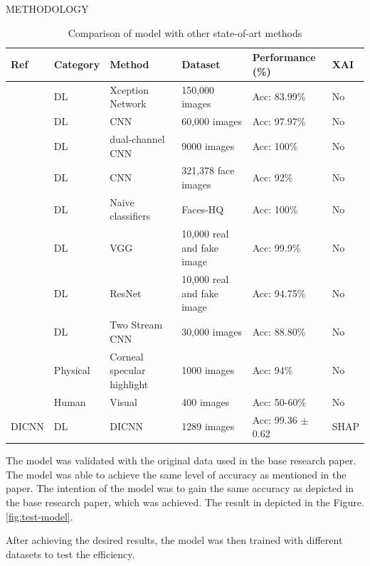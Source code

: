 \begin{section}[]{\uppercase{Methodology}}
\begin{table}[htbp]
    \centering
    \begin{adjustbox}{width=\textwidth}
    \begin{tabular}{llllll}
        \toprule
        \textbf{Ref} & \textbf{Category} & \textbf{Method} & \textbf{Dataset} & \textbf{Performance (\%)} & \textbf{XAI} \\
        \midrule
        \cite{Xu2022} & DL & Xception Network & 150,000 images & Acc: 83.99\% & No \\
        \cite{Fu2019} & DL & CNN & 60,000 images & Acc: 97.97\% & No \\
        \cite{Salman2022} & DL & dual-channel CNN & 9000 images & Acc: 100\% & No \\
        \cite{Zhang2017} & DL & CNN & 321,378 face images & Acc: 92\% & No \\
        \cite{Durall2019} & DL & Naive classifiers & Faces-HQ & Acc: 100\% & No \\
        \cite{Gandhi2020} & DL & VGG & 10,000 real and fake image & Acc: 99.9\% & No \\
        \cite{Gandhi2020} & DL & ResNet & 10,000 real and fake image & Acc: 94.75\% & No \\
        \cite{Yousaf2022} & DL & Two Stream CNN & 30,000 images & Acc: 88.80\% & No \\
        \cite{Hu2021} & Physical & Corneal specular highlight & 1000 images & Acc: 94\% & No \\
        \cite{Nightingale2021} & Human & Visual & 400 images & Acc: 50-60\% & No \\
        DICNN & DL & DICNN & 1289 images & Acc: 99.36 $\pm$ 0.62 & SHAP \\
        \bottomrule
    \end{tabular}
    \end{adjustbox}
    \caption{Comparison of model with other state-of-art methods}
    \label{tab:dicnn-comparison}
\end{table}

The model was validated with the original data used in the base research paper. The model was able to achieve the same level of accuracy as mentioned in the paper. The intention of the model was to gain the same accuracy as depicted in the base research paper, which was achieved. The result in depicted in the Figure. \ref{fig:test-model}.
\par After achieving the desired results, the model was then trained with different datasets to test the efficiency.


\end{section}
